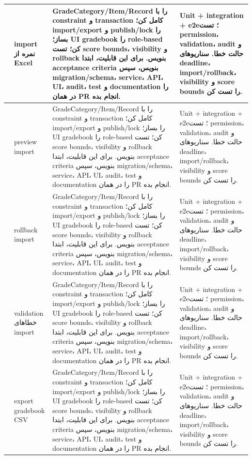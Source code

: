 \documentclass[11pt,a4paper]{article}
\begin{document}
\begin{longtable}{|>{\raggedleft\arraybackslash}p{}|>{\raggedleft\arraybackslash}p{}|>{\raggedleft\arraybackslash}p{}|>{\raggedleft\arraybackslash}p{}|}
130 & import نمره از Excel & GradeCategory/Item/Record را با constraint و transaction کامل کن؛ import/export و publish/lock را بساز؛ UI gradebook را role-based کن؛ تست score bounds، visibility و rollback بنویس. برای این قابلیت، ابتدا acceptance criteria بنویس، سپس migration/schema، service، API، UI، audit، test و documentation را در همان PR انجام بده. & Unit + integration + e2e؛ تست permission، validation، audit و حالت خطا. سناریوهای deadline، import/rollback، visibility و score bounds را تست کن. \\ \hline
131 & preview import & GradeCategory/Item/Record را با constraint و transaction کامل کن؛ import/export و publish/lock را بساز؛ UI gradebook را role-based کن؛ تست score bounds، visibility و rollback بنویس. برای این قابلیت، ابتدا acceptance criteria بنویس، سپس migration/schema، service، API، UI، audit، test و documentation را در همان PR انجام بده. & Unit + integration + e2e؛ تست permission، validation، audit و حالت خطا. سناریوهای deadline، import/rollback، visibility و score bounds را تست کن. \\ \hline
132 & rollback import & GradeCategory/Item/Record را با constraint و transaction کامل کن؛ import/export و publish/lock را بساز؛ UI gradebook را role-based کن؛ تست score bounds، visibility و rollback بنویس. برای این قابلیت، ابتدا acceptance criteria بنویس، سپس migration/schema، service، API، UI، audit، test و documentation را در همان PR انجام بده. & Unit + integration + e2e؛ تست permission، validation، audit و حالت خطا. سناریوهای deadline، import/rollback، visibility و score bounds را تست کن. \\ \hline
133 & validation خطاهای import & GradeCategory/Item/Record را با constraint و transaction کامل کن؛ import/export و publish/lock را بساز؛ UI gradebook را role-based کن؛ تست score bounds، visibility و rollback بنویس. برای این قابلیت، ابتدا acceptance criteria بنویس، سپس migration/schema، service، API، UI، audit، test و documentation را در همان PR انجام بده. & Unit + integration + e2e؛ تست permission، validation، audit و حالت خطا. سناریوهای deadline، import/rollback، visibility و score bounds را تست کن. \\ \hline
134 & export gradebook CSV & GradeCategory/Item/Record را با constraint و transaction کامل کن؛ import/export و publish/lock را بساز؛ UI gradebook را role-based کن؛ تست score bounds، visibility و rollback بنویس. برای این قابلیت، ابتدا acceptance criteria بنویس، سپس migration/schema، service، API، UI، audit، test و documentation را در همان PR انجام بده. & Unit + integration + e2e؛ تست permission، validation، audit و حالت خطا. سناریوهای deadline، import/rollback، visibility و score bounds را تست کن. \\ \hline

\end{longtable}
\end{document}
